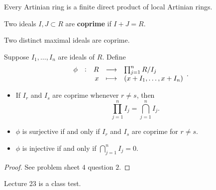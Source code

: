 \begin{theorem}
\label{thm:13.16}
Every Artinian ring is a finite direct product of local Artinian rings.
\end{theorem}

\begin{definition}
Two ideals $ I, J \subset R $ are \textbf{coprime} if $ I + J = R $.
\end{definition}

\begin{example*}
Two distinct maximal ideals are coprime.
\end{example*}

Suppose $ I_1, \dots, I_n $ are ideals of $ R $. Define
$$ \function[\phi]{R}{\prod_{j = 1}^n R / I_j}{x}{\br{x + I_1, \dots, x + I_n}}. $$

\begin{lemma}
\label{lem:13.18}
\hfill
\begin{itemize}
\item If $ I_r $ and $ I_s $ are coprime whenever $ r \ne s $, then
$$ \prod_{j = 1}^n I_j = \bigcap_{j = 1}^n I_j. $$
\item $ \phi $ is surjective if and only if $ I_r $ and $ I_s $ are coprime for $ r \ne s $.
\item $ \phi $ is injective if and only if $ \bigcap_{j = 1}^n I_j = 0 $.
\end{itemize}
\end{lemma}

\begin{proof}
See problem sheet $ 4 $ question $ 2 $.
\end{proof}


Lecture 23 is a class test.


